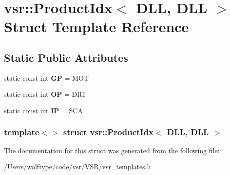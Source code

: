 \hypertarget{structvsr_1_1_product_idx_3_01_d_l_l_00_01_d_l_l_01_4}{\section{vsr\-:\-:Product\-Idx$<$ D\-L\-L, D\-L\-L $>$ Struct Template Reference}
\label{structvsr_1_1_product_idx_3_01_d_l_l_00_01_d_l_l_01_4}
}
\subsection*{Static Public Attributes}
\begin{DoxyCompactItemize}
\item 
\hypertarget{structvsr_1_1_product_idx_3_01_d_l_l_00_01_d_l_l_01_4_a168c0018261cdc56c191988620b13295}{static const int {\bfseries G\-P} = M\-O\-T}\label{structvsr_1_1_product_idx_3_01_d_l_l_00_01_d_l_l_01_4_a168c0018261cdc56c191988620b13295}

\item 
\hypertarget{structvsr_1_1_product_idx_3_01_d_l_l_00_01_d_l_l_01_4_ab325fccc064b3148e65d80b5f0fa6957}{static const int {\bfseries O\-P} = D\-R\-T}\label{structvsr_1_1_product_idx_3_01_d_l_l_00_01_d_l_l_01_4_ab325fccc064b3148e65d80b5f0fa6957}

\item 
\hypertarget{structvsr_1_1_product_idx_3_01_d_l_l_00_01_d_l_l_01_4_a698cc0c5c405efcb1808691948e52d24}{static const int {\bfseries I\-P} = S\-C\-A}\label{structvsr_1_1_product_idx_3_01_d_l_l_00_01_d_l_l_01_4_a698cc0c5c405efcb1808691948e52d24}

\end{DoxyCompactItemize}
\subsubsection*{template$<$$>$ struct vsr\-::\-Product\-Idx$<$ D\-L\-L, D\-L\-L $>$}



The documentation for this struct was generated from the following file\-:\begin{DoxyCompactItemize}
\item 
/\-Users/wolftype/code/vsr/\-V\-S\-R/vsr\-\_\-templates.\-h\end{DoxyCompactItemize}
